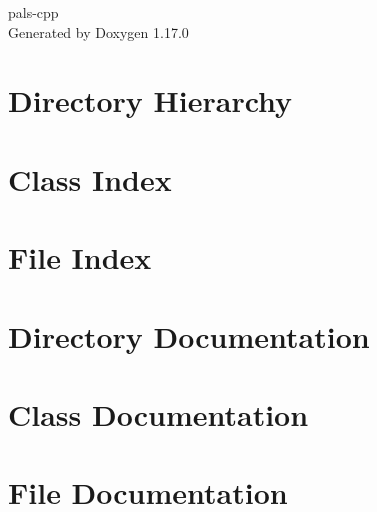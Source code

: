 \documentclass[twoside]{book}
\newcommand{\+}{\discretionary{\mbox{\scriptsize$\hookleftarrow$}}{}{}}
\newcommand{\clearemptydoublepage}{%
    \newpage{\pagestyle{empty}\cleardoublepage}%
  }
\begin{document}
  \raggedbottom
    \hypersetup{pageanchor=false,
                bookmarksnumbered=true,
                pdfencoding=unicode
               }
  \begin{titlepage}
  \vspace*{7cm}
  \begin{center}%
  {\Large pals-\/cpp}\\
  \vspace*{1cm}
  {\large Generated by Doxygen 1.17.0}\\
  \end{center}
  \end{titlepage}
  \clearemptydoublepage
  \tableofcontents
  \clearemptydoublepage
  \hypersetup{pageanchor=true}
\chapter{Directory Hierarchy}

\chapter{Class Index}

\chapter{File Index}

\chapter{Directory Documentation}

\chapter{Class Documentation}

\chapter{File Documentation}




  \backmatter
  \newpage
  \clearemptydoublepage
  \printindex
\end{document}
